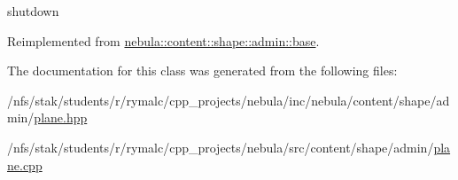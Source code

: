 shutdown 

Reimplemented from \hyperlink{classnebula_1_1content_1_1shape_1_1admin_1_1base_a61d6e9d7853ccf10ddd3d05311729f79}{nebula::content::shape::admin::base}.

The documentation for this class was generated from the following files:\begin{DoxyCompactItemize}
\item 
/nfs/stak/students/r/rymalc/cpp\_\-projects/nebula/inc/nebula/content/shape/admin/\hyperlink{admin_2plane_8hpp}{plane.hpp}\item 
/nfs/stak/students/r/rymalc/cpp\_\-projects/nebula/src/content/shape/admin/\hyperlink{admin_2plane_8cpp}{plane.cpp}\end{DoxyCompactItemize}
